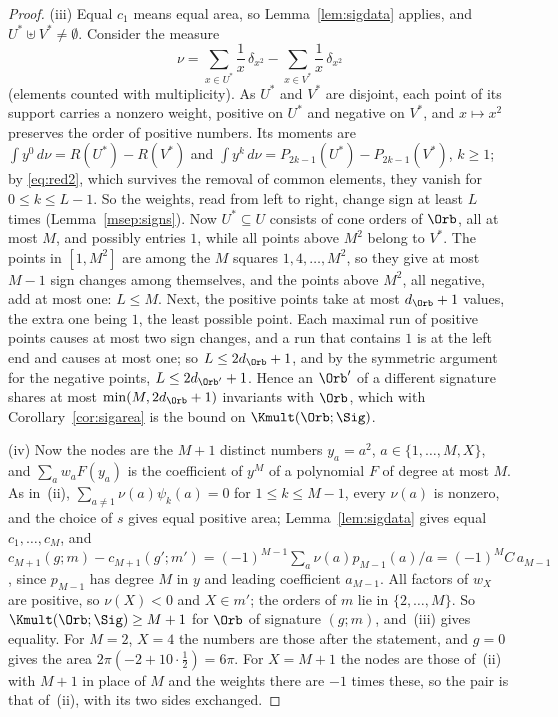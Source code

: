 \begin{proof}
(iii) Equal $c_1$ means equal area, so Lemma~\ref{lem:sigdata} applies, and $U^*\uplus V^*\ne\emptyset$. Consider the measure
\[
  \nu=\sum_{x\in U^*}\frac1x\,\delta_{x^2}-\sum_{x\in V^*}\frac1x\,\delta_{x^2}
\]
(elements counted with multiplicity). As $U^*$ and $V^*$ are disjoint, each point of its support carries a nonzero weight, positive on $U^*$ and negative on $V^*$, and $x\mapsto x^2$ preserves the order of positive numbers. Its moments are $\int y^0\,d\nu=R(U^*)-R(V^*)$ and $\int y^k\,d\nu=P_{2k-1}(U^*)-P_{2k-1}(V^*)$, $k\ge1$; by \eqref{eq:red2}, which survives the removal of common elements, they vanish for $0\le k\le L-1$. So the weights, read from left to right, change sign at least $L$ times (Lemma~\ref{msep:signs}). Now $U^*\subseteq U$ consists of cone orders of $\Orb$, all at most $M$, and possibly entries $1$, while all points above $M^2$ belong to $V^*$. The points in $[1,M^2]$ are among the $M$ squares $1,4,\dots,M^2$, so they give at most $M-1$ sign changes among themselves, and the points above $M^2$, all negative, add at most one: $L\le M$. Next, the positive points take at most $d_\Orb+1$ values, the extra one being $1$, the least possible point. Each maximal run of positive points causes at most two sign changes, and a run that contains $1$ is at the left end and causes at most one; so $L\le2d_\Orb+1$, and by the symmetric argument for the negative points, $L\le2d_{\Orb'}+1$. Hence an $\Orb'$ of a different signature shares at most $\min(M,2d_\Orb+1)$ invariants with $\Orb$, which with Corollary~\ref{cor:sigarea} is the bound on $\Kmult(\Orb;\Sig)$.

(iv) Now the nodes are the $M+1$ distinct numbers $y_a=a^2$, $a\in\{1,\dots,M,X\}$, and $\sum_aw_aF(y_a)$ is the coefficient of $y^M$ of a polynomial $F$ of degree at most $M$. As in~(ii), $\sum_{a\ne1}\nu(a)\psi_k(a)=0$ for $1\le k\le M-1$, every $\nu(a)$ is nonzero, and the choice of $s$ gives equal positive area; Lemma~\ref{lem:sigdata} gives equal $c_1,\dots,c_M$, and $c_{M+1}(g;m)-c_{M+1}(g';m')=(-1)^{M-1}\sum_a\nu(a)p_{M-1}(a)/a=(-1)^MC\,a_{M-1}$, since $p_{M-1}$ has degree $M$ in $y$ and leading coefficient $a_{M-1}$. All factors of $w_X$ are positive, so $\nu(X)<0$ and $X\in m'$; the orders of $m$ lie in $\{2,\dots,M\}$. So $\Kmult(\Orb;\Sig)\ge M+1$ for $\Orb$ of signature $(g;m)$, and~(iii) gives equality. For $M=2$, $X=4$ the numbers are those after the statement, and $g=0$ gives the area $2\pi(-2+10\cdot\frac12)=6\pi$. For $X=M+1$ the nodes are those of~(ii) with $M+1$ in place of $M$ and the weights there are $-1$ times these, so the pair is that of~(ii), with its two sides exchanged.
\end{proof}

